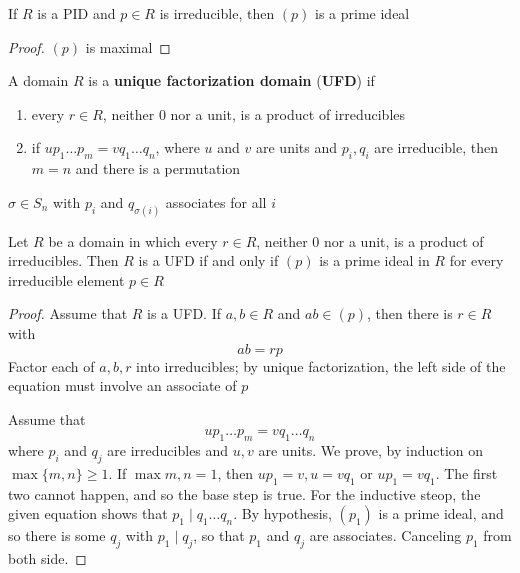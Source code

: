 \documentclass[11pt]{article}
\begin{document}
\begin{corollary}[]
If \(R\) is a PID and \(p\in R\) is irreducible, then \((p)\) is a prime ideal
\end{corollary}

\begin{proof}
\((p)\) is maximal
\end{proof}

\begin{definition}[]
A domain \(R\) is a \textbf{unique factorization domain} (\textbf{UFD}) if
\begin{enumerate}
\item every \(r\in R\), neither 0 nor a unit, is a product of irreducibles
\item if \(up_1\dots p_m=vq_1\dots q_n\), where \(u\) and \(v\) are units and
\(p_i,q_i\) are irreducible, then \(m=n\) and there is a permutation
\end{enumerate}
\(\sigma\in S_n\) with \(p_i\) and \(q_{\sigma(i)}\) associates for all \(i\)
\end{definition}

\begin{proposition}[]
\label{prop6.17}
Let \(R\) be a domain in which every \(r\in R\), neither 0 nor a unit, is a
product of irreducibles. Then \(R\) is a UFD if and only if \((p)\) is a prime
ideal in \(R\) for every irreducible element \(p\in R\)
\end{proposition}

\begin{proof}
Assume that \(R\) is a UFD. If \(a,b\in R\) and \(ab\in(p)\), then there is
\(r\in R\) with
\begin{equation*}
ab=rp
\end{equation*}
Factor each of \(a,b,r\) into irreducibles; by unique factorization, the left
side of the equation must involve an associate of \(p\)

Assume that 
\begin{equation*}
up_1\dots p_m=vq_1\dots q_n
\end{equation*}
where \(p_i\) and \(q_j\) are irreducibles and \(u,v\) are units. We prove,
by induction on \(\max\{m,n\}\ge1\). If \(\max{m,n}=1\), then 
\(up_1=v,u=vq_1\) or \(up_1=vq_1\). The first two cannot happen, and so the
base step is true. For the inductive steop, the given equation shows that 
\(p_1\mid q_1\dots q_n\). By hypothesis, \((p_1)\) is a prime ideal, and so
there is some \(q_j\) with \(p_1\mid q_j\), so that \(p_1\) and \(q_j\) are
associates. Canceling \(p_1\) from both side.
\end{proof}
\end{document}
